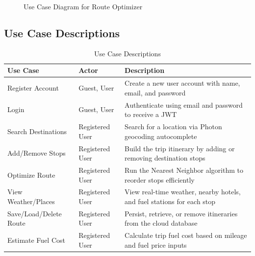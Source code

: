 \begin{figure}[H]
    \caption{Use Case Diagram for Route Optimizer}
    \label{fig:Use_case}
\end{figure}

\subsection{Use Case Descriptions}
\begin{table}[H]
    \centering
    \renewcommand{\arraystretch}{1.3}
    \small
    \begin{tabular}{|p{3cm}|p{3cm}|p{7cm}|}
        \hline
        \textbf{Use Case} & \textbf{Actor} & \textbf{Description} \\
        \hline
        Register Account & Guest, User & Create a new user account with name, email, and password \\
        \hline
        Login & Guest, User & Authenticate using email and password to receive a JWT \\
        \hline
        Search Destinations & Registered User & Search for a location via Photon geocoding autocomplete \\
        \hline
        Add/Remove Stops & Registered User & Build the trip itinerary by adding or removing destination stops \\
        \hline
        Optimize Route & Registered User & Run the Nearest Neighbor algorithm to reorder stops efficiently \\
        \hline
        View Weather/Places & Registered User & View real-time weather, nearby hotels, and fuel stations for each stop \\
        \hline
        Save/Load/Delete Route & Registered User & Persist, retrieve, or remove itineraries from the cloud database \\
        \hline
        Estimate Fuel Cost & Registered User & Calculate trip fuel cost based on mileage and fuel price inputs \\
        \hline
    \end{tabular}
    \caption{Use Case Descriptions}
    \label{tab:use_case_desc}
\end{table}

